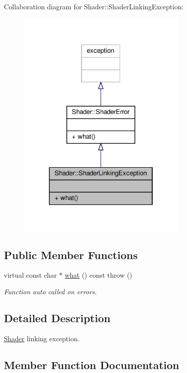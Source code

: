 Collaboration diagram for Shader\+:\+:Shader\+Linking\+Exception\+:
\nopagebreak
\begin{figure}[H]
\begin{center}
\leavevmode
\includegraphics[width=238pt]{class_shader_1_1_shader_linking_exception__coll__graph}
\end{center}
\end{figure}
\subsection*{Public Member Functions}
\begin{DoxyCompactItemize}
\item 
virtual const char $\ast$ \hyperlink{class_shader_1_1_shader_linking_exception_a99267f7b7ba184b4ccd2e5e50650cf95}{what} () const  throw ()
\begin{DoxyCompactList}\small\item\em Function auto called on errors. \end{DoxyCompactList}\end{DoxyCompactItemize}


\subsection{Detailed Description}
\hyperlink{class_shader}{Shader} linking exception. 

\subsection{Member Function Documentation}
\mbox{\label{class_shader_1_1_shader_linking_exception_a99267f7b7ba184b4ccd2e5e50650cf95}} 
